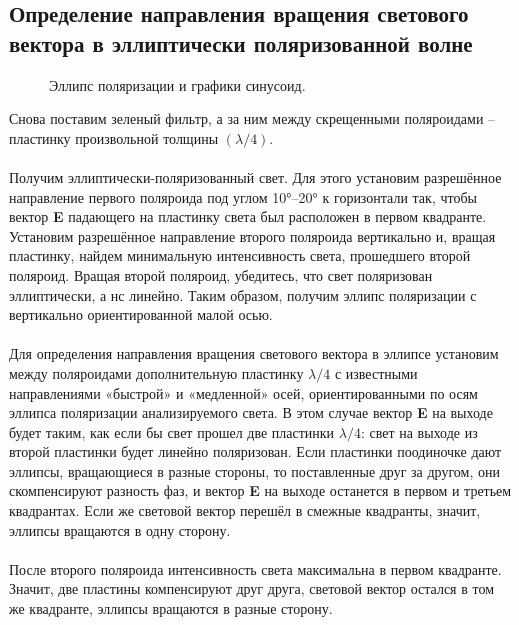 \documentclass[a4paper,12pt]{article} %
\begin{document}
\subsection{Определение направления вращения светового вектора в эллиптически поляризованной волне}

\begin{figure}[H]
	\caption{\centering Эллипс поляризации и графики синусоид.}
	\label{pic:5}
\end{figure}
Снова поставим зеленый фильтр, а за ним между скрещенными поляроидами -- пластинку произвольной толщины $( \lambda / 4 )$.
\\\\
Получим эллиптически-поляризованный свет. Для этого установим разрешённое направление первого поляроида под углом 10°--20° к горизонтали так, чтобы вектор \textbf{E} падающего на пластинку света был расположен в первом квадранте. Установим разрешённое направление второго поляроида вертикально и, вращая пластинку, найдем минимальную интенсивность света, прошедшего второй поляроид. Вращая второй поляроид, убедитесь, что свет поляризован эллиптически, а нс линейно. Таким образом, получим эллипс поляризации с вертикально ориентированной малой осью.
\\\\
Для определения направления вращения светового вектора в эллипсе установим между поляроидами дополнительную пластинку $ \lambda / 4 $ с известными направлениями «быстрой» и «медленной» осей, ориентированными по осям эллипса поляризации анализируемого света. В этом случае вектор \textbf{E} на выходе будет таким, как если бы свет прошел две пластинки $ \lambda / 4 $: свет на выходе из второй пластинки будет линейно поляризован. Если пластинки поодиночке дают эллипсы, вращающиеся в разные стороны, то поставленные друг за другом, они скомпенсируют разность фаз, и вектор \textbf{E} на выходе останется в первом и третьем квадрантах. Если же световой вектор перешёл в смежные квадранты, значит, эллипсы вращаются в одну сторону.
\\\\
После второго поляроида интенсивность света максимальна в первом квадранте. Значит, две пластины компенсируют друг друга, световой вектор остался в том же квадранте, эллипсы вращаются в разные сторону.
\end{document}
